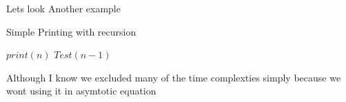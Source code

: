 \documentclass[]{article}
\begin{document}
Lets look Another example
\begin{algorithm}[H]
    \caption{Simple Printing with recursion}
    \label{printRecursion}
    \begin{algorithmic}
         
             
                \State$print(n)$ 
            \EndFor
            \State$Test(n-1)$   
        \EndIf
        \EndProcedure
    \end{algorithmic}
\end{algorithm}

Although I know we excluded many of the time complexties simply because we wont using it in asymtotic equation
\end{document}
